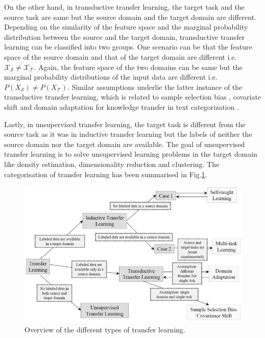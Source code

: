 \vspace{5mm}

On the other hand, in transductive transfer learning, the target task and the source task are same but the source domain and the target domain are different. Depending on the similarity of the feature space and the marginal probability distribution between the source and the target domain, transductive transfer learning can be classified into two groups. One scenario can be that the feature space of the source domain and that of the target domain are different i.e. $\mathcal{X_{\mathcal{S}}} \neq \mathcal{X_{\mathcal{T}}}$. Again, the feature space of the two domains can be same but the  marginal probability distributions of the input data are different i.e. $P(X_{\mathcal{S}}) \neq P(X_{\mathcal{T}})$. Similar assumptions underlie the latter instance of the transductive transfer learning, which is related to sample selection bias \cite{zadrozny2004learning}, covariate shift \cite{shimodaira2000improving} and domain adaptation for knowledge transfer in text categorization \cite{daume2006domain,zadrozny2004learning}.\cite{pan2009survey}

\vspace{5mm}

Lastly, in unsupervised transfer learning, the target task is different from the source task as it was in inductive transfer learning but the labels of neither the source domain nor the target domain are available. The goal of unsupervised transfer learning is to solve unsupervised learning problems in the target domain like density estimation, dimensionality reduction and clustering\cite{dai2008self,wang2008transferred}. The categorisation of transfer learning has been summarised in Fig.\ref{fig:transfer_learning_overview}.
\begin{figure}[t]
  \centering
  \includegraphics[width=350pt,height=200pt]{pictures/transfer_learning_types.PNG}
  \caption{Overview of the different types of transfer learning.\cite{pan2009survey}}
  \label{fig:transfer_learning_overview}
\end{figure} 

